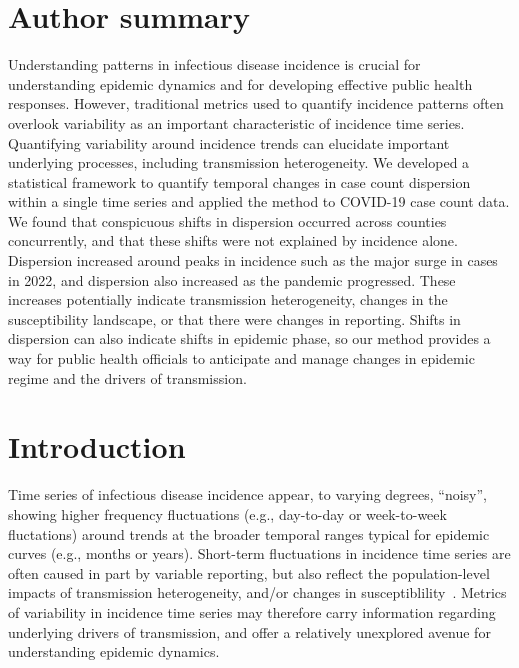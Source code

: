 \documentclass[11pt,letterpaper]{article}
\begin{document}
\section*{Author summary}
Understanding patterns in infectious disease incidence is crucial for understanding epidemic dynamics and for developing effective public health responses. 
However, traditional metrics used to quantify incidence patterns often overlook variability as an important characteristic of incidence time series. 
Quantifying variability around incidence trends can elucidate important underlying processes, including transmission heterogeneity.
We developed a statistical framework to quantify temporal changes in case count dispersion within a single time series and applied the method to COVID-19 case count data. We found that conspicuous shifts in dispersion occurred across counties concurrently, and that these shifts were not explained by incidence alone. 
Dispersion increased around peaks in incidence such as the major surge in cases in 2022, and dispersion also increased as the pandemic progressed. 
These increases potentially indicate transmission heterogeneity, changes in the susceptibility landscape, or that there were changes in reporting.
Shifts in dispersion can also indicate shifts in epidemic phase, so our method provides a way for public health officials to anticipate and manage changes in epidemic regime and the drivers of transmission. 

\section*{Introduction}
Time series of infectious disease incidence appear, to varying degrees, ``noisy'', showing higher frequency fluctuations (e.g., day-to-day or week-to-week fluctations) around trends at the broader temporal ranges typical for epidemic curves (e.g., months or years).
Short-term fluctuations in incidence time series are often caused in part by variable reporting, but also reflect the population-level impacts of transmission heterogeneity, and/or changes in susceptiblility~\cite{lloyd2005superspreading, kirkegaard2021superspreading, sun2021transmission,guo2023statistical,ko2023time}.
Metrics of variability in incidence time series may therefore carry information regarding underlying drivers of transmission, and offer a relatively unexplored avenue for understanding epidemic dynamics. 
\end{document}
